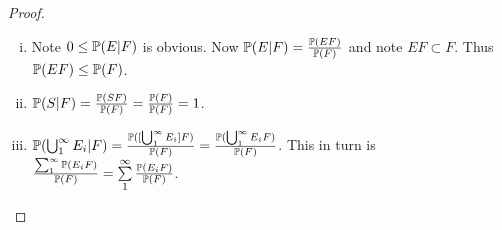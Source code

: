 \documentclass[a4paper,11pt]{article}
\begin{document}
\begin{outline}
    \begin{proof}
      \begin{enumerate}[i.]
        \item
          Note \(0 \leq \mathbb{P}(E|F)\) is obvious. Now \(\mathbb{P}(E|F) = \frac{\mathbb{P}(EF)}{\mathbb{P}(F)}\) and note
          \(EF \subset F\). Thus \(\mathbb{P}(EF) \leq \mathbb{P}(F)\).
        \item
          \(\mathbb{P}(S|F) = \frac{\mathbb{P}(SF)}{\mathbb{P}(F)} = \frac{\mathbb{P}(F)}{\mathbb{P}(F)} = 1\).
        \item
          \(\mathbb{P}(\bigcup_{1}^{\infty} E_i|F) = \frac{\mathbb{P}([\bigcup_{1}^{\infty} E_i]F)}{\mathbb{P}(F)}
          = \frac{\mathbb{P}(\bigcup_{1}^{\infty}E_iF)}{\mathbb{P}(F)}\). This in turn is
          \(\frac{\sum_{1}^{\infty} \mathbb{P}(E_iF)}{\mathbb{P}(F)} = \sum\limits_{1}^{\infty} \frac{\mathbb{P}(E_iF)}{\mathbb{P}(F)}\).
      \end{enumerate}
    \end{proof}
\end{outline}
\end{document}
